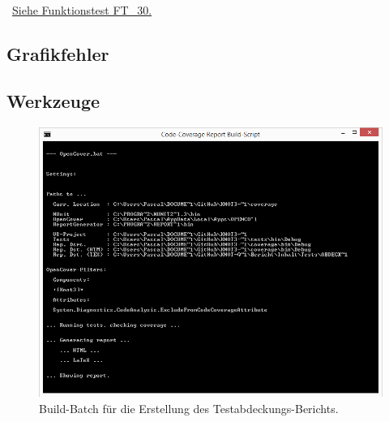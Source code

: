 		~\\\mousecursor~\hyperref[FT:30:Schlaufe]{Siehe Funktionstest FT\_30.} 
	
	
\clearpage	
% 



\newpage




\subsection*{Grafikfehler}



\newpage



\subsection*{Werkzeuge}



\begin{figure}[ht]

	\centering
	
	\includegraphics[width=\textwidth]{Inhalt/Anhang/Grafiken/Werkzeuge/Code-Coverage Report Build-Script.png}
	
	\caption{Build-Batch für die Erstellung des Testabdeckungs-Berichts.}

\end{figure}








